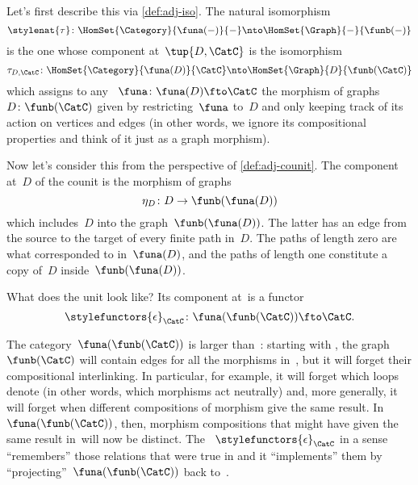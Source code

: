 Let's first describe this  via \cref{def:adj-iso}.
The natural isomorphism
\begin{equation}
    \stylenat{\tau}\colon \HomSet{\Category}{\funa(-)}{-} \nto \HomSet{\Graph}{-}{\funb(-)}
\end{equation}
is the one whose component at~$\tup{D,\CatC}$ is the isomorphism
\begin{equation}
    \tau_{D,\CatC} \colon \HomSet{\Category}{\funa(D)}{\CatC} \nto \HomSet{\Graph}{D}{\funb(\CatC)}
\end{equation}
which assigns to any ~$\funa\colon \funa(D) \fto \CatC$ the morphism of graphs~$D \colon \funb(\CatC)$ given by restricting~$\funa$ to~$D$ and only keeping track of its action on vertices and edges (in other words, we ignore its compositional properties and think of it just as a graph morphism).

Now let's consider this  from the perspective of \cref{def:adj-counit}.
The component at~$D$ of the counit is the morphism of graphs
\begin{equation}
    \eta_D \colon D \to  \funb(\funa(D))
\end{equation}
which includes~$D$ into the graph~$\funb(\funa(D))$.
The latter has an edge from the source to the target of every finite path in~$D$.
The paths of length zero are what corresponded to   in~$\funa(D)$, and the paths of length one constitute a copy of~$D$ inside~$\funb(\funa(D))$.

What does the unit look like?
Its component at~\CatC is a functor
\begin{equation}
    \stylefunctors{\epsilon}_{\CatC} \colon \funa(\funb(\CatC)) \fto \CatC.
\end{equation}

The category~$\funa(\funb(\CatC))$ is larger than~\CatC: starting with \CatC, the graph~$\funb(\CatC)$ will contain edges for all the morphisms in~\CatC, but it will forget their compositional interlinking.
In particular, for example, it will forget which loops denote   (in other words, which morphisms act neutrally) and, more generally, it will forget when different compositions of morphism give the same result.
In~$\funa(\funb(\CatC))$, then, morphism compositions that might have given the same result in~\CatC will now be distinct.
The ~$\stylefunctors{\epsilon}_{\CatC}$ in a sense ``remembers'' those relations that were true in \CatC and it ``implements'' them by ``projecting''~$\funa(\funb(\CatC))$ back to~\CatC.
